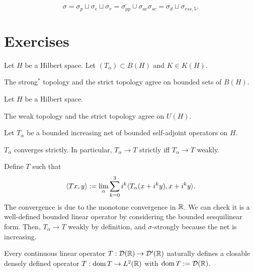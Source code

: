 \documentclass{../../large}
\begin{document}
\[\sigma=\sigma_p\sqcup\sigma_c\sqcup\sigma_r=\bar{\sigma_{pp}}\cup\sigma_{ac}\sigma_{sc}=\sigma_d\sqcup\sigma_{ess,5}.\]





\section*{Exercises}


\begin{prb}
Let $H$ be a Hilbert space.
Let $(T_\alpha)\subset B(H)$ and $K\in K(H)$.
\begin{parts}
\item The strong$^*$ topology and the strict topology agree on bounded sets of $B(H)$.
\end{parts}
\end{prb}

\begin{prb}
Let $H$ be a Hilbert space.
\begin{parts}
\item The weak topology and the strict topology agree on $U(H)$.
\end{parts}
\end{prb}


\begin{prb}
Let $T_\alpha$ be a bounded increasing net of bounded self-adjoint operators on $H$.
\begin{parts}
\item $T_\alpha$ converges strictly. In particular, $T_\alpha\to T$ strictly iff $T_\alpha\to T$ weakly.
\end{parts}
\end{prb}
\begin{pf}
Define $T$ such that
\[\langle Tx,y\rangle:=\lim_\alpha\sum_{k=0}^3i^k\langle T_\alpha(x+i^ky),x+i^ky\rangle.\]
The convergence is due to the monotone convergence in $\mathbb{R}$.
We can check it is a well-defined bounded linear operator by considering the bounded sesquilinear form.
Then, $T_\alpha\to T$ weakly by definition, and $\sigma$-strongly because the net is increasing.
\end{pf}




\begin{prb}
\begin{parts}
\item Every continuous linear operator $T:\mathcal{D}(\mathbb{R})\to\mathcal{D}'(\mathbb{R})$ naturally defines a closable densely defined operator $T:\operatorname{dom} T\to L^2(\mathbb{R})$ with $\operatorname{dom} T:=\mathcal{D}(\mathbb{R})$.
\end{parts}
\end{prb}
\end{document}
